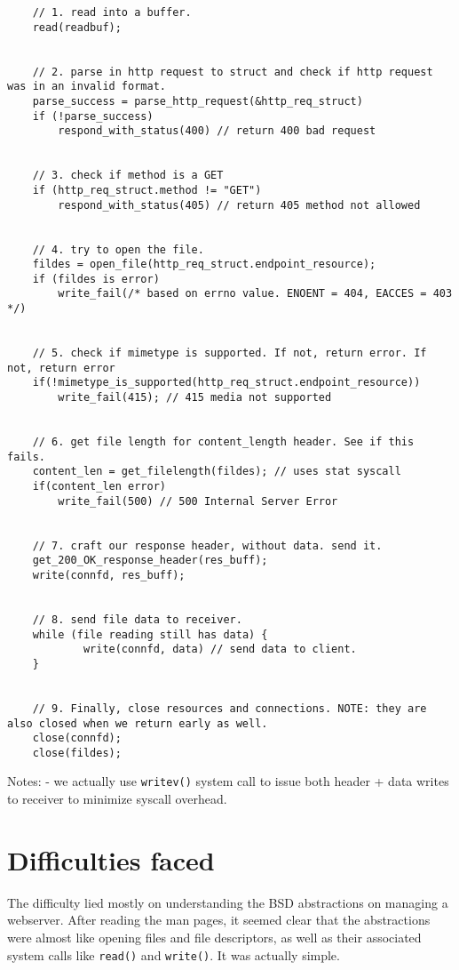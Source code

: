 \documentclass[11pt]{article}
\begin{document}
\begin{verbatim}
    // 1. read into a buffer.
    read(readbuf);


    // 2. parse in http request to struct and check if http request was in an invalid format.
    parse_success = parse_http_request(&http_req_struct)      
    if (!parse_success) 
        respond_with_status(400) // return 400 bad request


    // 3. check if method is a GET
    if (http_req_struct.method != "GET")
        respond_with_status(405) // return 405 method not allowed
    

    // 4. try to open the file. 
    fildes = open_file(http_req_struct.endpoint_resource);
    if (fildes is error) 
        write_fail(/* based on errno value. ENOENT = 404, EACCES = 403 */)
        

    // 5. check if mimetype is supported. If not, return error. If not, return error
    if(!mimetype_is_supported(http_req_struct.endpoint_resource))
        write_fail(415); // 415 media not supported


    // 6. get file length for content_length header. See if this fails.
    content_len = get_filelength(fildes); // uses stat syscall
    if(content_len error)
        write_fail(500) // 500 Internal Server Error
        

    // 7. craft our response header, without data. send it.
    get_200_OK_response_header(res_buff);
    write(connfd, res_buff);


    // 8. send file data to receiver.
    while (file reading still has data) {
            write(connfd, data) // send data to client.
    }


    // 9. Finally, close resources and connections. NOTE: they are also closed when we return early as well.
    close(connfd);
    close(fildes);
\end{verbatim}

Notes:
- we actually use \texttt{writev()} system call to issue both header + data writes to receiver to minimize syscall overhead.


\section{Difficulties faced}
The difficulty lied mostly on understanding the BSD abstractions on managing a webserver.
After reading the man pages, it seemed clear that the abstractions were almost like opening files and file descriptors, as well
as their associated system calls like \texttt{read()} and \texttt{write()}. It was actually simple.
\end{document}
